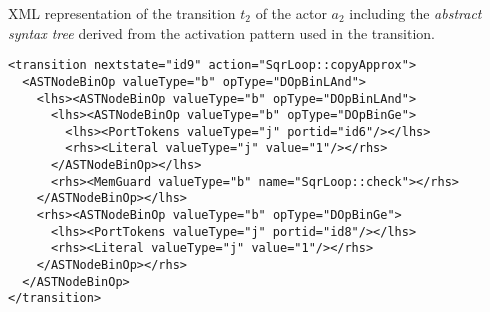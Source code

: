 \begin{example}\label{ex:xml-t2-sqrloop}%
XML representation of the transition $t_2$ of the  actor $a_2$ including the \emph{abstract syntax tree} derived from the activation pattern used in the transition.
\begin{verbatim}
<transition nextstate="id9" action="SqrLoop::copyApprox">
  <ASTNodeBinOp valueType="b" opType="DOpBinLAnd">
    <lhs><ASTNodeBinOp valueType="b" opType="DOpBinLAnd">
      <lhs><ASTNodeBinOp valueType="b" opType="DOpBinGe">
        <lhs><PortTokens valueType="j" portid="id6"/></lhs>
        <rhs><Literal valueType="j" value="1"/></rhs>
      </ASTNodeBinOp></lhs>
      <rhs><MemGuard valueType="b" name="SqrLoop::check"></rhs>
    </ASTNodeBinOp></lhs>
    <rhs><ASTNodeBinOp valueType="b" opType="DOpBinGe">
      <lhs><PortTokens valueType="j" portid="id8"/></lhs>
      <rhs><Literal valueType="j" value="1"/></rhs>
    </ASTNodeBinOp></rhs>
  </ASTNodeBinOp>
</transition>
\end{verbatim}
\end{example}
